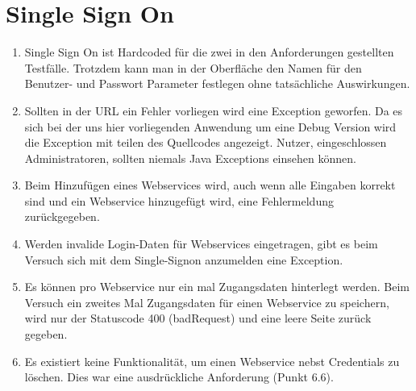\documentclass[12pt,DIV14,BCOR10mm,a4paper,parskip=half-,headsepline,headinclude,english,ngerman,bibliography=totocnumbered]{scrreprt}
\begin{document}
\section{Single Sign On}
\begin{enumerate}
 \item Single Sign On ist Hardcoded für die zwei in den Anforderungen gestellten Testfälle. Trotzdem kann man in der Oberfläche den Namen für den Benutzer- und Passwort Parameter festlegen ohne tatsächliche Auswirkungen.
  \item Sollten in der URL ein Fehler vorliegen wird eine Exception geworfen. Da es sich bei der uns hier vorliegenden Anwendung um eine Debug Version wird die Exception mit teilen des Quellcodes angezeigt. Nutzer, eingeschlossen Administratoren, sollten niemals Java Exceptions einsehen können.
  \item Beim Hinzufügen eines Webservices wird, auch wenn alle Eingaben korrekt sind und ein Webservice hinzugefügt wird, eine Fehlermeldung zurückgegeben.
     \item Werden invalide Login-Daten für Webservices eingetragen, gibt es beim Versuch sich mit dem Single-Signon anzumelden eine Exception.
\item Es können pro Webservice nur ein mal Zugangsdaten hinterlegt werden. Beim Versuch ein zweites Mal Zugangsdaten für einen Webservice zu speichern, wird nur der Statuscode 400 (badRequest) und eine leere Seite zurück gegeben.
\item Es existiert keine Funktionalität, um einen Webservice nebst Credentials zu löschen. Dies war eine ausdrückliche Anforderung (Punkt 6.6).
 \end{enumerate}
 
\end{document}
